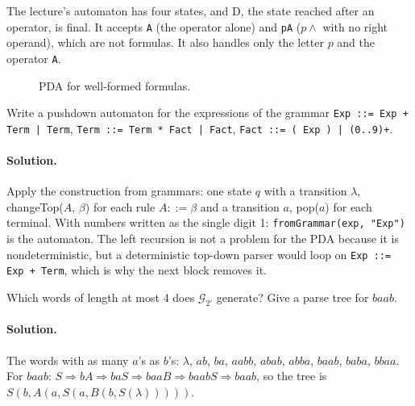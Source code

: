 The lecture's automaton has four states, and D, the state reached after an
operator, is final. It accepts \texttt{A} (the operator alone) and \texttt{pA}
($p \wedge$ with no right operand), which are not formulas. It also handles only
the letter $p$ and the operator \texttt{A}.

\begin{figure}[h]
\centering
{}
\caption{PDA for well-formed formulas.}
\label{fig:wff-pda}
\end{figure}

\begin{exercise}
Write a pushdown automaton for the expressions of the grammar
\texttt{Exp ::= Exp + Term | Term}, \texttt{Term ::= Term * Fact | Fact},
\texttt{Fact ::= ( Exp ) | (0..9)+}.
\end{exercise}

\paragraph{Solution.} Apply the construction from grammars: one state $q$ with a
transition $\lambda$, changeTop($A$, $\beta$) for each rule $A ::= \beta$ and a
transition $a$, pop($a$) for each terminal. With numbers written as the single
digit 1:
\texttt{fromGrammar(exp, "Exp")} is the automaton. The left recursion is not a
problem for the PDA because it is nondeterministic, but a deterministic
top-down parser would loop on \texttt{Exp ::= Exp + Term}, which is why the
next block removes it.

\begin{exercise}
Which words of length at most 4 does $\mathcal{G}_{2'}$ generate? Give a parse
tree for $baab$.
\end{exercise}

\paragraph{Solution.} The words with as many $a$'s as $b$'s: $\lambda$, $ab$, $ba$,
$aabb$, $abab$, $abba$, $baab$, $baba$, $bbaa$. For $baab$:
$S \Rightarrow bA \Rightarrow baS \Rightarrow baaB \Rightarrow baabS \Rightarrow baab$, so the
tree is $S(b, A(a, S(a, B(b, S(\lambda)))))$.

